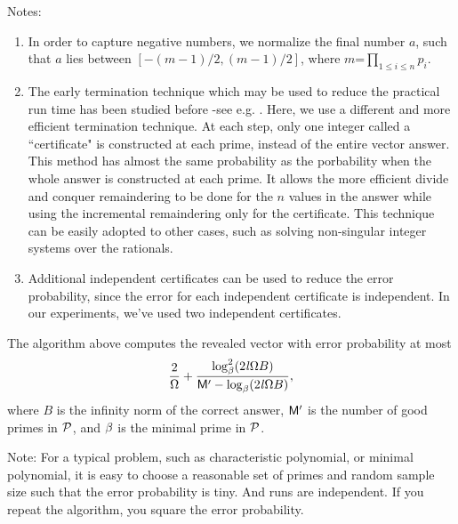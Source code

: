 Notes:
\begin{enumerate}
\item
In order to capture negative numbers, 
we normalize the final number $a$, 
such that $a$ lies between $[-(m-1)/2, (m-1)/2]$, 
where $m$=$\prod_{1\leq i \leq n} p_i$.
\item
The early termination technique which may be used to reduce the practical run time
has been studied before -see e.g. \cite{Emiris98,Kaltofen02, Eberly03}.
Here, we use a different and more efficient termination technique.
At each step, only one integer called a ``certificate" is constructed 
at each prime, instead of the entire vector answer. This method has almost
the same probability as the porbability when the whole answer is constructed at each prime.  It allows the more efficient divide and conquer remaindering
to be done for the $n$ values in the answer while using the incremental
remaindering only for the certificate.
This technique can be easily adopted to other cases,
such as solving non-singular integer systems over the rationals.
\item
Additional independent certificates can be used to reduce the error probability,
since the error for each independent certificate is independent.
In our experiments, we've used two independent certificates.  
\end{enumerate}
\begin{theorem}
The algorithm above computes the revealed vector with error probability at most 
\[\frac{2}{\Omega} +
\frac{\log^2_{\beta}(2\mathit l \Omega B)}
{\mathsf M^\prime - \log_{\beta}(2\mathit l \Omega B)},\]
where $B$ is the infinity norm of the correct answer,
$\mathsf M^\prime$ is the number of good primes in $\mathcal P$,
and $\beta$ is the minimal prime in $\mathcal P$.
\end{theorem}

Note: For a typical problem, such as characteristic polynomial, 
or minimal polynomial, it is easy to choose a reasonable set of primes 
and random sample size
such that the error probability is tiny.  And runs are independent. If you
repeat the algorithm, you square the error probability.


